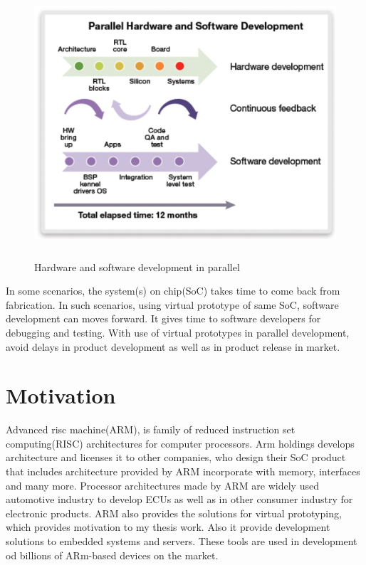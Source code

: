 \begin{figure}[h!]
\includegraphics[width=12cm, height=10cm]{./images/par_dev}
\centering
\caption{Hardware and software development in parallel}
\label{fig:par_dev}
\end{figure}

\par In some scenarios, the system(s) on chip(SoC) takes time to come back from fabrication. In such scenarios, using virtual prototype of same SoC, software development can moves forward. It gives time to software developers for debugging and testing. With use of virtual prototypes in parallel development, avoid delays in product development as well as in product release in market. 

\section{Motivation}
Advanced risc machine(ARM), is family of reduced instruction set computing(RISC) architectures for computer processors. Arm holdings develops architecture and licenses it to other companies, who design their SoC product that includes architecture provided by ARM incorporate with memory, interfaces and many more. Processor architectures made by ARM are widely used automotive industry to develop ECUs as well as in other consumer industry for electronic products. ARM also provides the solutions for virtual prototyping, which provides motivation to my thesis work. Also it provide development solutions to embedded systems and servers. These tools are used in development od billions of ARm-based devices on the market.

